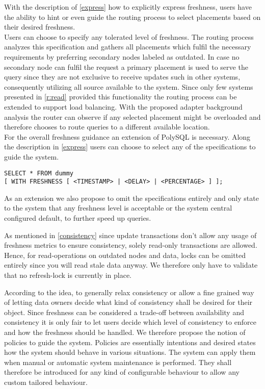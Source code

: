 With the description of \ref{express} how to explicitly express freshness, users have the ability to hint or even guide the routing process to select placements 
based on their desired freshness.\\
Users can choose to specify any tolerated level of freshness. The routing process analyzes this specification and gathers all placements which fulfil the necessary 
requirements by preferring secondary nodes labeled as outdated.
In case no secondary node can fulfil the request a primary placement is used to serve the query since they are not exclusive to receive updates such in other systems,
consequently utilizing all source available to the system.
Since only few systems presented in \ref{r:read} provided this functionality the routing process can be extended to support load balancing. 
With the proposed adapter background analysis the router can observe if any selected placement might be overloaded and therefore chooses to route 
queries to a different available location. \\



For the overall freshness guidance an extension of PolySQL is necessary.
Along the description in \ref{express} users can choose to select any of the specifications to guide the system.
\begin{verbatim}
SELECT * FROM dummy 
[ WITH FRESHNESS [ <TIMESTAMP> | <DELAY> | <PERCENTAGE> ] ];
\end{verbatim}
As an extension we also propose to omit the specifications entirely and only state to the system that any freshness level is acceptable or the system central
configured default, to further speed up queries.



As mentioned in \ref{consistency} since update transactions don't allow any usage of freshness metrics to ensure consistency, solely read-only transactions are allowed.
Hence, for read-operations on outdated nodes and data, locks can be omitted entirely since you will read stale data anyway.
We therefore only have to validate that no refresh-lock is currently in place.






According to the idea, to generally relax consistency or allow a fine grained way of letting data owners decide what kind of consistency shall be desired for their object. 
Since freshness can be considered a trade-off between availability and consistency it is only fair to let users decide which level of consistency to enforce and 
how the freshness should be handled. We therefore propose the notion of policies to guide the system.
Policies are essentially intentions and desired states how the system should behave in various situations. 
The system can apply them when manual or automatic system maintenance is performed.
They shall therefore be introduced for any kind of configurable behaviour to allow any custom tailored behaviour. \\

